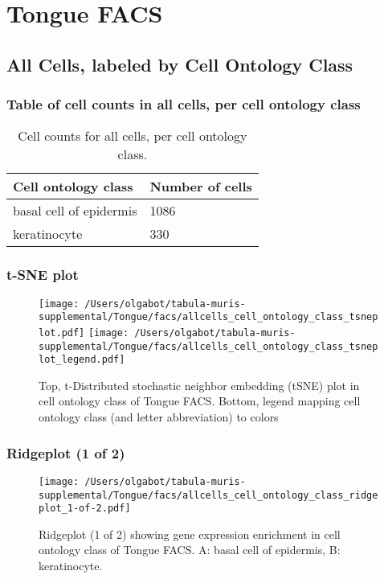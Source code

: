 \clearpage
\section{Tongue FACS}

\subsection{All Cells, labeled by Cell Ontology Class}
\subsubsection{Table of cell counts in all cells, per cell ontology class}\begin{table}[h]
\centering
\label{my-label}
\begin{tabular}{@{}ll@{}}
\toprule

Cell ontology class& Number of cells \\ \midrule
basal cell of epidermis & 1086 \\

keratinocyte & 330 \\
\bottomrule
\end{tabular}
\caption{Cell counts for all cells, per cell ontology class.}
\end{table}

\clearpage
\subsubsection{t-SNE plot}
\begin{figure}[h]
\centering
\texttt{[image: /Users/olgabot/tabula-muris-supplemental/Tongue/facs/allcells\_cell\_ontology\_class\_tsneplot.pdf]}
\texttt{[image: /Users/olgabot/tabula-muris-supplemental/Tongue/facs/allcells\_cell\_ontology\_class\_tsneplot\_legend.pdf]}
\caption{Top, t-Distributed stochastic neighbor embedding (tSNE) plot  in cell ontology class of Tongue FACS. Bottom, legend mapping cell ontology class (and letter abbreviation) to colors}
\end{figure}


\clearpage
\clearpage
\subsubsection{Ridgeplot (1 of 2)}
\begin{figure}[h]
\centering
\texttt{[image: /Users/olgabot/tabula-muris-supplemental/Tongue/facs/allcells\_cell\_ontology\_class\_ridgeplot\_1-of-2.pdf]}

\caption{ Ridgeplot (1 of 2)  showing gene expression enrichment in cell ontology class of Tongue FACS. A: basal cell of epidermis, B: keratinocyte.}
\end{figure}



